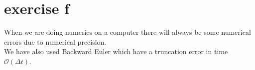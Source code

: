 \section{exercise f}

When we are doing numerics on a computer there will always be some numerical errors due to numerical precision.\\
We have also used Backward Euler which have a truncation error in time $\mathcal{O}(\Delta t)$.